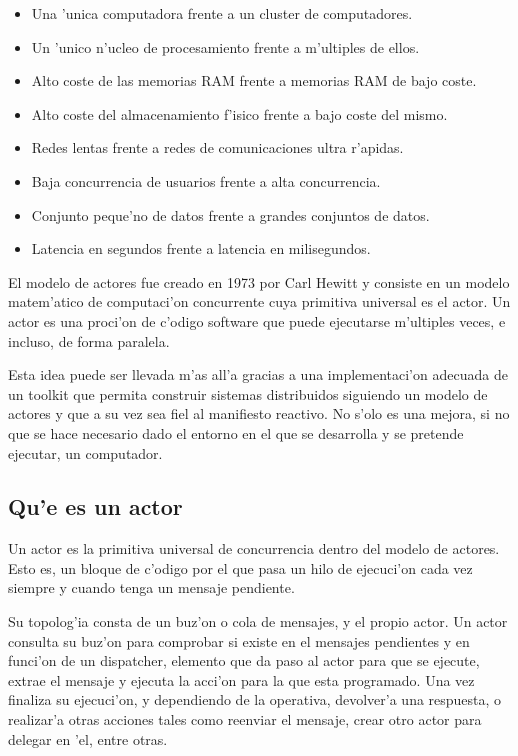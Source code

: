 \documentclass[12pt]{article}
\begin{document}
\begin{itemize}
	\item Una 'unica computadora frente a un cluster de computadores.
	\item Un 'unico n'ucleo de procesamiento frente a m'ultiples de ellos.
	\item Alto coste de las memorias RAM frente a memorias RAM de bajo coste.
	\item Alto coste del almacenamiento f'isico frente a bajo coste del mismo.
    \item Redes lentas frente a redes de comunicaciones ultra r'apidas.
    \item Baja concurrencia de usuarios frente a alta concurrencia.
    \item Conjunto peque'no de datos frente a grandes conjuntos de datos.
    \item Latencia en segundos frente a latencia en milisegundos.
\end{itemize}

El modelo de actores fue creado en 1973 por Carl Hewitt y consiste en un modelo
matem'atico de computaci'on concurrente cuya primitiva universal es el actor. Un actor es
una proci'on de c'odigo software que puede ejecutarse m'ultiples veces, e incluso,
de forma paralela.

Esta idea puede ser llevada m'as all'a gracias a una implementaci'on adecuada de un toolkit
que permita construir sistemas distribuidos siguiendo un modelo de actores y que a su vez
sea fiel al manifiesto reactivo. No s'olo es una mejora, si no que se hace necesario dado
el entorno en el que se desarrolla y se pretende ejecutar, un computador.

\subsection{Qu'e es un actor}
\label{sub:que es un actor}
Un actor es la primitiva universal de concurrencia dentro del modelo de actores. Esto es,
un bloque de c'odigo por el que pasa un hilo de ejecuci'on cada vez siempre y cuando
tenga un mensaje pendiente.

Su topolog'ia consta de un buz'on o cola de mensajes, y el propio actor. Un actor consulta su
buz'on para comprobar si existe en el mensajes pendientes y en funci'on de un dispatcher, elemento
que da paso al actor para que se ejecute, extrae el mensaje y ejecuta la acci'on para la que
esta programado. Una vez finaliza su ejecuci'on, y dependiendo de la operativa, devolver'a una
respuesta, o realizar'a otras acciones tales como reenviar el mensaje, crear otro actor
para delegar en 'el, entre otras.
\end{document}
